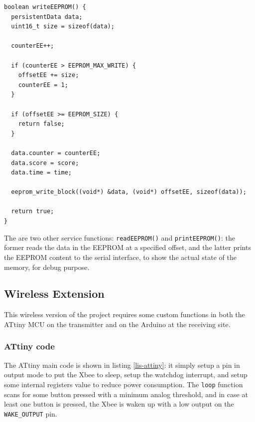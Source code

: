 \documentclass[11pt,english]{article}
\newcommand{\code}[1]{\texttt{#1}}
\begin{document}
%
\begin{lstlisting}[label=lis:writeEEPROM,caption=writeEEPROM() function]
boolean writeEEPROM() {
  persistentData data;
  uint16_t size = sizeof(data);

  counterEE++;

  if (counterEE > EEPROM_MAX_WRITE) {
    offsetEE += size;
    counterEE = 1;
  }

  if (offsetEE >= EEPROM_SIZE) {
    return false;
  }

  data.counter = counterEE;
  data.score = score;
  data.time = time;

  eeprom_write_block((void*) &data, (void*) offsetEE, sizeof(data));

  return true;
}
\end{lstlisting}

The are two other service functions: \code{readEEPROM()} and \code{printEEPROM()}: the former reads the data in the 
EEPROM at a specified offset, and the latter prints the EEPROM content to the serial interface, to show the actual 
state of the memory, for debug purpose.


\subsection{Wireless Extension}\label{subsec:sw-wireless}

This wireless version of the project requires some custom functions in both the ATtiny MCU on the transmitter and 
on the Arduino at the receiving site.

\subsubsection{ATtiny code}\label{subsubsec:sw-attiny}

The ATtiny main code is shown in listing \ref{lis-attiny}: it simply setup a pin in output mode to put the Xbee 
to sleep, setup the watchdog interrupt, and setup some internal registers value to reduce power consumption.
The \code{loop} function scans for some button pressed with a minimum analog threshold, and in case at least 
one button is pressed, the Xbee is waken up with a low output on the \code{WAKE\_OUTPUT} pin.
\end{document}

